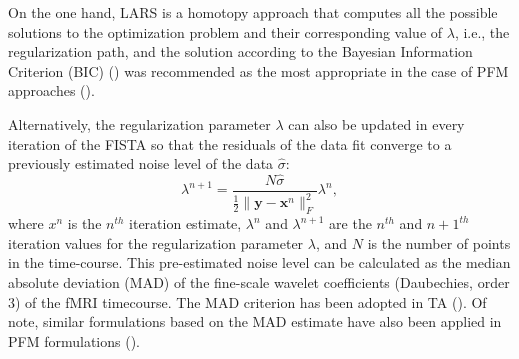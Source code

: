 On the one hand, LARS is a homotopy approach that computes all the possible solutions to the optimization problem and their corresponding value of $\lambda$, i.e., the regularization path, and the solution according to the Bayesian Information Criterion (BIC) (\citealt{Schwarz1978EstimatingDimensionModel}) was recommended as the most appropriate in the case of PFM approaches (\citealt{Gaudes2013Paradigmfreemapping,CaballeroGaudes2019deconvolutionalgorithmmulti}). 

Alternatively, the regularization parameter $\lambda$ can also be updated in every iteration of the FISTA so that the residuals of the data fit converge to a previously estimated noise level of the data $\hat{\sigma}$:
\begin{equation}
    \lambda^{n+1} = \frac{N \hat{\sigma}}{\frac{1}{2} \| \mathbf{y} - \mathbf{x}^n \|_F^2} \lambda^n,
\label{eq:std}
\end{equation}
where $x^n$ is the $n^{th}$ iteration estimate, $\lambda^n$ and $\lambda^{n+1}$ are the $n^{th}$ and $n+1^{th}$ iteration values for the regularization parameter $\lambda$, and $N$ is the number of points in the time-course. This pre-estimated noise level can be calculated as the median absolute deviation (MAD) of the fine-scale wavelet coefficients (Daubechies, order 3) of the fMRI timecourse. The MAD criterion has been adopted in TA (\citealt{Karahanoglu2013TotalactivationfMRI}). Of note, similar formulations based on the MAD estimate have also been applied in PFM formulations (\citealt{Gaudes2012Structuredsparsedeconvolution,Gaudes2011MorphologicalPFM}).

